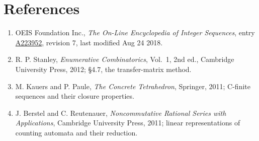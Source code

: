 \documentclass[11pt]{article}
\theoremstyle{definition}
\begin{document}
\section{References}

\begin{enumerate}

\item OEIS Foundation Inc., \emph{The On-Line Encyclopedia of Integer Sequences}, entry \href{https://oeis.org/A223952}{A223952}, revision 7, last modified Aug 24 2018.

\item R. P. Stanley, \emph{Enumerative Combinatorics}, Vol.~1, 2nd ed., Cambridge University Press, 2012; \S4.7, the transfer-matrix method.

\item M. Kauers and P. Paule, \emph{The Concrete Tetrahedron}, Springer, 2011; C-finite sequences and their closure properties.

\item J. Berstel and C. Reutenauer, \emph{Noncommutative Rational Series with Applications}, Cambridge University Press, 2011; linear representations of counting automata and their reduction.

\end{enumerate}
\end{document}
